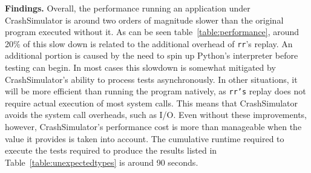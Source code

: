 {\bf Findings.}
Overall, the performance running an application
under CrashSimulator is around
two orders of magnitude slower
than the original program executed without it.
As can be seen table~\ref{table:performance}, around 20\%
of this slow down is related to the additional overhead of {\tt rr}'s replay.
An additional portion is caused by the need to spin up Python's interpreter
before testing can begin.
In most cases
this slowdown is somewhat mitigated by CrashSimulator's ability to process
tests asynchronously. In other situations, it will be more efficient than
running the program natively, as {\tt rr's} replay does not require
actual execution of most system calls.  This means that CrashSimulator
avoids the system call overheads, such as I/O.
Even without these improvements, however, CrashSimulator's performance
cost is more
than manageable when the value it provides is taken into account.  The
cumulative runtime required to execute the tests required to produce the
results listed in Table~\ref{table:unexpectedtypes} is around 90 seconds.

